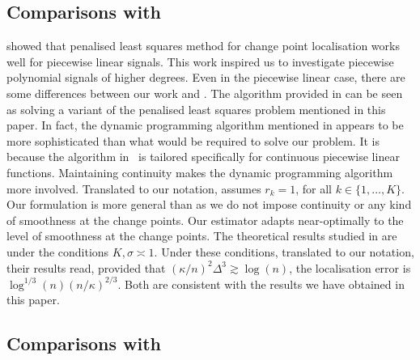 \documentclass{article}
\begin{document}
\subsection{Comparisons with \cite{fearnhead2019detecting}}\label{sec-comparisons2}
 
\cite{fearnhead2019detecting} showed that penalised least squares method for change point localisation works well for piecewise linear signals.  This work inspired us to investigate piecewise polynomial signals of higher degrees.  Even in the piecewise linear case, there are some differences between our work and \cite{fearnhead2019detecting}.  The algorithm provided in \cite{fearnhead2019detecting} can be seen as solving a variant of the penalised least squares problem mentioned in this paper.  In fact, the dynamic programming algorithm mentioned in \cite{fearnhead2019detecting} appears to be more sophisticated than what would be required to solve our problem.  It is because the algorithm in~\cite{fearnhead2019detecting} is tailored specifically for continuous piecewise linear functions.  Maintaining continuity makes the dynamic programming algorithm more involved. Translated to our notation, \cite{fearnhead2019detecting} assumes $r_k = 1$, for all $k \in \{1, \ldots, K\}$.  Our formulation is more general than \cite{fearnhead2019detecting} as we do not impose continuity or any kind of smoothness at the change points.  Our estimator adapts near-optimally to the level of smoothness at the change points. The theoretical results studied in \cite{fearnhead2019detecting} are under the conditions $K, \sigma \asymp 1$.  Under these conditions, translated to our notation, their results read, provided that $(\kappa/n)^2 \Delta^3 \gtrsim \log(n)$, the localisation error is $\log^{1/3}(n) (n/\kappa)^{2/3}$.  Both are consistent with the results we have obtained in this paper. 

\subsection{Comparisons with  \cite{raimondo1998minimax}}\label{sec-other-comp}
\end{document}
